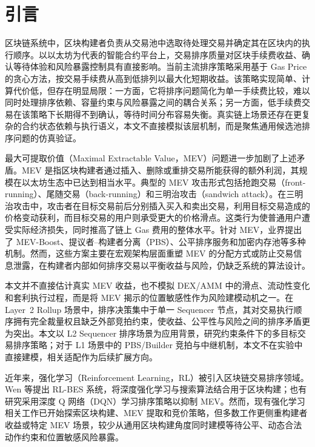 
\section{引言}

区块链系统中，区块构建者负责从交易池中选取待处理交易并确定其在区块内的执行顺序。以以太坊为代表的智能合约平台上，交易排序质量对区块手续费收益、确认等待体验和风险暴露控制具有直接影响\cite{daian2019flash}。当前主流排序策略采用基于 Gas Price 的贪心方法，按交易手续费从高到低排列以最大化短期收益。该策略实现简单、计算代价低，但存在明显局限：一方面，它将排序问题简化为单一手续费比较，难以同时处理排序依赖、容量约束与风险暴露之间的耦合关系；另一方面，低手续费交易在该策略下长期得不到确认，等待时间分布容易失衡。真实链上场景还存在更复杂的合约状态依赖与执行语义，本文不直接模拟该层机制，而是聚焦通用候选池排序问题的仿真验证。

最大可提取价值（Maximal Extractable Value，MEV）问题进一步加剧了上述矛盾\cite{daian2019flash}。MEV 是指区块构建者通过插入、删除或重排交易所能获得的额外利润，其规模在以太坊生态中已达到相当水平。典型的 MEV 攻击形式包括抢跑交易（front-running）、尾随交易（back-running）和三明治攻击（sandwich attack）\cite{chi2024remeasure}。在三明治攻击中，攻击者在目标交易前后分别插入买入和卖出交易，利用目标交易造成的价格变动获利，而目标交易的用户则承受更大的价格滑点。这类行为使普通用户遭受实际经济损失，同时推高了链上 Gas 费用的整体水平。针对 MEV，业界提出了 MEV-Boost\cite{flashbots2022mevboost}、提议者--构建者分离（PBS）\cite{ethereum2024pbs}、公平排序服务和加密内存池等多种机制。然而，这些方案主要在宏观架构层面重塑 MEV 的分配方式或防止交易信息泄露，在构建者内部如何排序交易以平衡收益与风险，仍缺乏系统的算法设计\cite{alipanahloo2024mev}。

本文并不直接估计真实 MEV 收益，也不模拟 DEX/AMM 中的滑点、流动性变化和套利执行过程，而是将 MEV 揭示的位置敏感性作为风险建模动机之一。在 Layer~2 Rollup 场景中，排序决策集中于单一 Sequencer 节点，其对交易执行顺序拥有完全裁量权且缺乏外部竞拍约束，使收益、公平性与风险之间的排序矛盾更为突出。本文以 L2 Sequencer 排序场景为应用背景，研究约束条件下的多目标交易排序策略；对于 L1 场景中的 PBS/Builder 竞拍与中继机制，本文不在实验中直接建模，相关适配作为后续扩展方向。

近年来，强化学习（Reinforcement Learning，RL）被引入区块链交易排序领域。Wen 等\cite{wen2025rlbes}提出 RL-BES 系统，将深度强化学习与搜索算法结合用于区块构建；也有研究采用深度 Q 网络（DQN）学习排序策略以抑制 MEV。然而，现有强化学习相关工作已开始探索区块构建、MEV 提取和竞价策略，但多数工作更侧重构建者收益或特定 MEV 场景，较少从通用区块构建角度同时建模等待公平、动态合法动作约束和位置敏感风险暴露。

